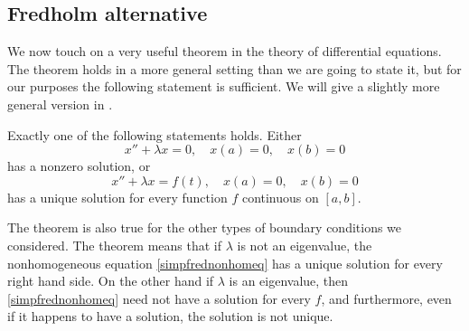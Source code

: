 %



\subsection{Fredholm alternative}

We now touch on a very useful theorem in the theory of differential
equations.  The theorem holds in a more general setting than we are
going to state it, but for our purposes the following statement is
sufficient.  We will give a slightly more general version in
.

\begin{theorem}
\label{thm:fredholmsimple}
Exactly one of the following statements holds.
Either
\begin{equation} \label{simpfredhomeq}
x'' + \lambda x = 0, \quad x(a) = 0, \quad x(b) = 0
\end{equation}
has a nonzero solution, or
\begin{equation} \label{simpfrednonhomeq}
x'' + \lambda x = f(t), \quad x(a) = 0, \quad x(b) = 0
\end{equation}
has a unique solution for every function $f$ continuous on $[a,b]$.
\end{theorem}

The theorem is also true for the other types of
boundary conditions we considered.
The theorem means that if $\lambda$ is not an eigenvalue, the nonhomogeneous
equation \eqref{simpfrednonhomeq} has a unique solution for every right hand
side.  On the other hand if $\lambda$ is an eigenvalue, then 
\eqref{simpfrednonhomeq} need not have a solution for every $f$,
and furthermore,
even if it happens to have a solution, the solution is not
unique.

